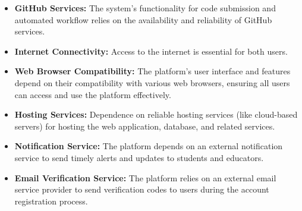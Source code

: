 \begin{itemize}
    \item \textbf{GitHub Services:} The system's functionality for code submission and automated workflow relies on the availability and reliability of GitHub services.

    \item \textbf{Internet Connectivity:} Access to the internet is essential for both users.

    \item \textbf{Web Browser Compatibility:} The platform's user interface and features depend on their compatibility with various web browsers, ensuring all users can access and use the platform effectively.

    \item \textbf{Hosting Services:} Dependence on reliable hosting services (like cloud-based servers) for hosting the web application, database, and related services.

    \item \textbf{Notification Service:} The platform depends on an external notification service to send timely alerts and updates to students and educators.

    \item \textbf{Email Verification Service:} The platform relies on an external email service provider to send verification codes to users during the account registration process.

    
\end{itemize}
